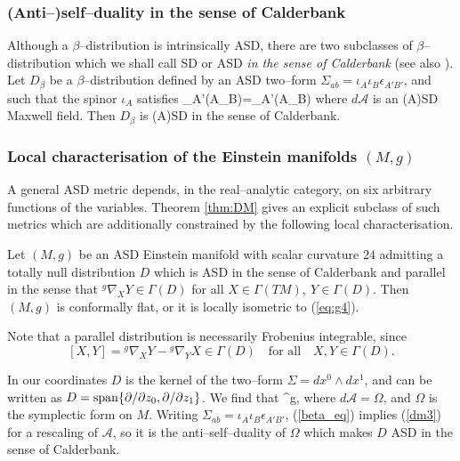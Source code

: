 \subsubsection{(Anti--)self--duality in the sense of Calderbank}
Although a $\beta$--distribution is intrinsically ASD, there are two subclasses of $\beta$--distribution which we shall call SD or ASD \textit{in the sense of Calderbank} \cite{Cal1} (see also \cite{West}). Let $D_\beta$ be a $\beta$--distribution defined by an ASD two--form $\Sigma_{ab}=\iota_A\iota_B\epsilon_{A'B'}$, and  such that the spinor $\iota_A$ satisfies
\be
\label{dm3}
\nabla_{A'(A}\iota_{B)}=_{A'(A}\iota_{B)}
\ee
where $d\mathcal{A}$ is an (A)SD Maxwell field. Then $D_\beta$ is (A)SD in the sense of Calderbank.

 
\subsubsection{Local characterisation of the Einstein manifolds $(M,g)$}

A general ASD metric depends, in the real--analytic category, on six arbitrary functions of the variables. Theorem \ref{thm:DM} gives an explicit subclass of such metrics which are additionally constrained by the following local characterisation.

\begin{theo}\cite{DM} \label{thm:DMcharacterisation}
Let $(M,g)$ be an ASD Einstein manifold with scalar curvature $24$ admitting a totally null distribution $D$ which is ASD in the sense of Calderbank and parallel in the sense that $^g\nabla_XY\in\Gamma(D)$ for all $X\in \Gamma(TM),\ Y\in\Gamma(D)$. Then $(M,g)$ is conformally flat, or it is locally isometric to (\ref{eq:g4}).
\end{theo}
\noindent
Note that a parallel distribution is necessarily Frobenius integrable, since
\[
[X,Y]= {^g}\nabla_XY- {^g}\nabla_YX\in\Gamma(D)\quad\mbox{for all}\quad X,Y\in\Gamma(D).
\]

In our coordinates $D$ is the kernel of the two--form $\Sigma=dx^0\wedge dx^1$, and can be written as ${D}=\mathrm{span}\{\partial/\partial z_0,\partial/\partial z_1\}$. We find that
\be
\label{beta_eq}
^g\nabla{}\otimes \Sigma,
\ee
where $d\mathcal{A}=\Omega$, and $\Omega$ is the symplectic form on $M$. Writing $\Sigma_{ab}=\iota_A\iota_B\epsilon_{A'B'}$, (\ref{beta_eq}) implies (\ref{dm3}) for a rescaling of $\mathcal{A}$, so it is the anti--self--duality of $\Omega$ which makes $D$ ASD in the sense of Calderbank. 

